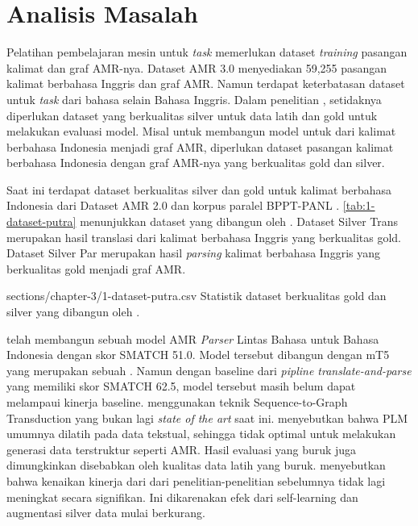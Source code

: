 \section{Analisis Masalah}

Pelatihan pembelajaran mesin untuk \textit{task} \amrparsing{} memerlukan dataset \textit{training} pasangan kalimat dan graf \gls{AMR}-nya.
Dataset AMR 3.0 menyediakan 59,255 pasangan kalimat berbahasa Inggris dan graf \gls{AMR}.
Namun terdapat keterbatasan dataset untuk \textit{task} \amrparsing{} dari bahasa selain Bahasa Inggris.
Dalam penelitian \textcite{blloshmi2020}, setidaknya diperlukan dataset yang berkualitas silver untuk data latih dan gold untuk melakukan evaluasi model.
Misal untuk membangun model untuk \amrparsing{} dari kalimat berbahasa Indonesia menjadi graf \gls{AMR}, diperlukan dataset pasangan kalimat berbahasa Indonesia dengan graf \gls{AMR}-nya yang berkualitas gold dan silver.

Saat ini terdapat dataset berkualitas silver dan gold untuk kalimat berbahasa Indonesia dari Dataset AMR 2.0 dan korpus paralel BPPT-PANL .
\cref{tab:1-dataset-putra} menunjukkan dataset yang dibangun oleh \textcite{putra2022}.
Dataset Silver Trans merupakan hasil translasi dari kalimat berbahasa Inggris yang berkualitas gold.
Dataset Silver Par merupakan hasil \textit{parsing} kalimat berbahasa Inggris yang berkualitas gold menjadi graf \gls{AMR}.

  {sections/chapter-3/1-dataset-putra.csv}
  {Statistik dataset berkualitas gold dan silver yang dibangun oleh \textcite{putra2022}.}

\textcite{putra2022} telah membangun sebuah model \gls{AMR} \textit{Parser} Lintas Bahasa untuk Bahasa Indonesia dengan skor \gls{SMATCH} 51.0.
Model tersebut dibangun dengan \mwordem{} mT5 yang merupakan sebuah .
Namun dengan baseline dari \textit{pipline translate-and-parse} yang memiliki skor \gls{SMATCH} 62.5, model tersebut masih belum dapat melampaui kinerja baseline.
\textcite{putra2022} menggunakan teknik Sequence-to-Graph Transduction  yang bukan lagi \textit{state of the art} \amrparsing{} saat ini.
\textcite{bai2022} menyebutkan bahwa \gls{PLM} umumnya dilatih pada data tekstual, sehingga tidak optimal untuk melakukan generasi data terstruktur seperti \gls{AMR}.
Hasil evaluasi yang buruk juga dimungkinkan disebabkan oleh kualitas data latih yang buruk.
\textcite{lee2022} menyebutkan bahwa kenaikan kinerja dari \amrparsing{} dari penelitian-penelitian sebelumnya tidak lagi meningkat secara signifikan.
Ini dikarenakan efek dari self-learning dan augmentasi silver data mulai berkurang.
